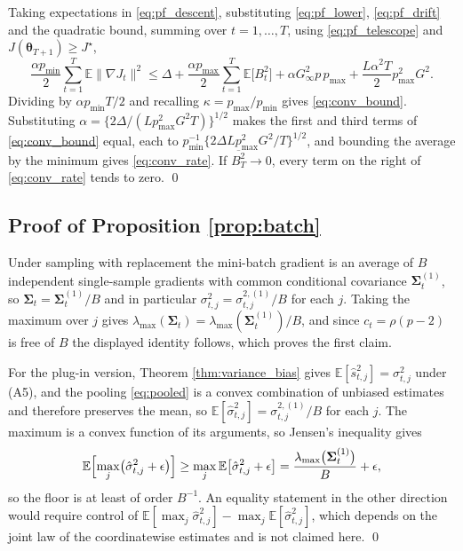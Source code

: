 \documentclass[a4paper,fleqn]{cas-sc}
\theoremstyle{plain}
\theoremstyle{definition}
\theoremstyle{remark}
\newcommand{\E}{\mathbb{E}}
\begin{document}
\begin{appendices}
Taking expectations in \eqref{eq:pf_descent}, substituting \eqref{eq:pf_lower}, \eqref{eq:pf_drift} and the quadratic bound, summing over $t=1,\dots,T$, using \eqref{eq:pf_telescope} and $J(\bm\theta_{T+1})\ge J^\star$,
\begin{equation}
\frac{\alpha p_{\min}}{2}\sum_{t=1}^{T}\E\|\nabla J_t\|^{2}
\le
\Delta
+\frac{\alpha p_{\max}}{2}\sum_{t=1}^{T}\E\bigl[B^2_t\bigr]
+\alpha G_\infty^{2}p\,p_{\max}
+\frac{L\alpha^{2}T}{2}p^{2}_{\max}G^{2}.
\end{equation}
Dividing by $\alpha p_{\min}T/2$ and recalling $\kappa=p_{\max}/p_{\min}$ gives \eqref{eq:conv_bound}. Substituting $\alpha=\{2\Delta/(Lp^2_{\max}G^2T)\}^{1/2}$ makes the first and third terms of \eqref{eq:conv_bound} equal, each to $p_{\min}^{-1}\{2\Delta Lp^2_{\max}G^2/T\}^{1/2}$, and bounding the average by the minimum gives \eqref{eq:conv_rate}. If $\overline{B^2_T}\to0$, every term on the right of \eqref{eq:conv_rate} tends to zero. \qed

\subsection*{Proof of Proposition \ref{prop:batch}}

Under sampling with replacement the mini-batch gradient is an average of $B$ independent single-sample gradients with common conditional covariance $\bm\Sigma^{(1)}_t$, so $\bm\Sigma_t=\bm\Sigma^{(1)}_t/B$ and in particular $\sigma^2_{t,j}=\sigma^{2,(1)}_{t,j}/B$ for each $j$. Taking the maximum over $j$ gives $\lambda_{\max}(\bm\Sigma_t)=\lambda_{\max}(\bm\Sigma^{(1)}_t)/B$, and since $c_t=\rho(p-2)$ is free of $B$ the displayed identity follows, which proves the first claim.

For the plug-in version, Theorem \ref{thm:variance_bias} gives $\E[\hat s^2_{t,j}]=\sigma^2_{t,j}$ under (A5), and the pooling \eqref{eq:pooled} is a convex combination of unbiased estimates and therefore preserves the mean, so $\E[\hat\sigma^2_{t,j}]=\sigma^{2,(1)}_{t,j}/B$ for each $j$. The maximum is a convex function of its arguments, so Jensen's inequality gives
\begin{equation}
\E\Bigl[\max_j\bigl(\hat\sigma^2_{t,j}+\epsilon\bigr)\Bigr]
\ge
\max_j\E\bigl[\hat\sigma^2_{t,j}+\epsilon\bigr]
=\frac{\lambda_{\max}\bigl(\bm\Sigma^{(1)}_t\bigr)}{B}+\epsilon ,
\end{equation}
so the floor is at least of order $B^{-1}$. An equality statement in the other direction would require control of $\E[\max_j\hat\sigma^2_{t,j}]-\max_j\E[\hat\sigma^2_{t,j}]$, which depends on the joint law of the coordinatewise estimates and is not claimed here. \qed

\end{appendices}






\end{document}
